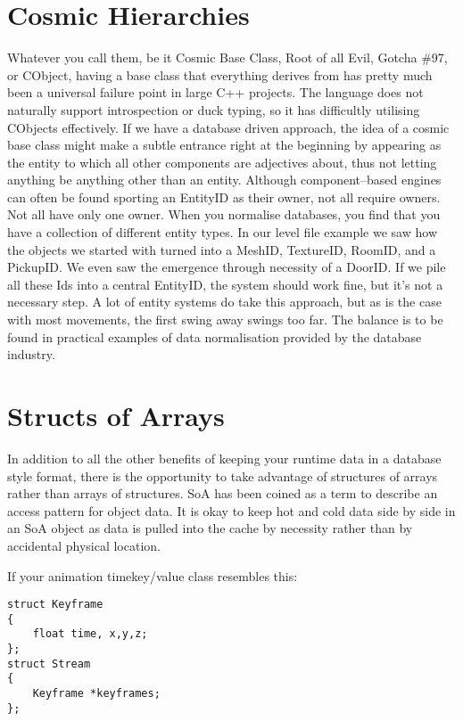 \section{Cosmic Hierarchies}

Whatever you call them, be it Cosmic Base Class, Root of all Evil, Gotcha \#97,
or CObject, having a base class that everything derives from has pretty much
been a universal failure point in large C++ projects. The language does not
naturally support introspection or duck typing, so it has difficultly utilising
CObjects effectively. If we have a database driven approach, the idea of a
cosmic base class might make a subtle entrance right at the beginning by
appearing as the entity to which all other components are adjectives about,
thus not letting anything be anything other than an entity. Although
component--based engines can often be found sporting an EntityID as their
owner, not all require owners.  Not all have only one owner.  When you
normalise databases, you find that you have a collection of different entity
types. In our level file example we saw how the objects we started with turned
into a MeshID, TextureID, RoomID, and a PickupID.  We even saw the emergence
through necessity of a DoorID. If we pile all these Ids into a central
EntityID, the system should work fine, but it's not a necessary step. A lot of
entity systems do take this approach, but as is the case with most movements,
the first swing away swings too far.  The balance is to be found in practical
examples of data normalisation provided by the database industry.

\section{Structs of Arrays}

In addition to all the other benefits of keeping your runtime data in a
database style format, there is the opportunity to take advantage of structures
of arrays rather than arrays of structures. SoA has been coined as a term to
describe an access pattern for object data. It is okay to keep hot and cold
data side by side in an SoA object as data is pulled into the cache by
necessity rather than by accidental physical location.

If your animation timekey/value class resembles this:

\begin{lstlisting}[caption=animation timekey/value class]
struct Keyframe
{
	float time, x,y,z;
};
struct Stream
{
	Keyframe *keyframes;
};
\end{lstlisting}
\label{src:animstruct}

